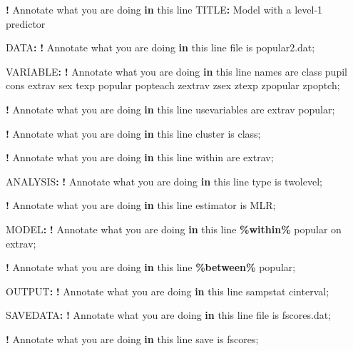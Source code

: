\documentclass[
]{book}
\newenvironment{Shaded}{\begin{snugshade}}{\end{snugshade}}
\newcommand{\ControlFlowTok}[1]{\textcolor[rgb]{0.13,0.29,0.53}{\textbf{#1}}}
\newcommand{\DecValTok}[1]{\textcolor[rgb]{0.00,0.00,0.81}{#1}}
\newcommand{\NormalTok}[1]{#1}
\newcommand{\SpecialCharTok}[1]{\textcolor[rgb]{0.81,0.36,0.00}{\textbf{#1}}}
\begin{document}
\begin{Shaded}
\begin{Highlighting}[]
\SpecialCharTok{!}\NormalTok{ Annotate what you are doing }\ControlFlowTok{in}\NormalTok{ this line}
\NormalTok{TITLE}\SpecialCharTok{:}\NormalTok{ Model with a level}\DecValTok{{-}1}\NormalTok{ predictor}

\NormalTok{DATA}\SpecialCharTok{:}
    \SpecialCharTok{!}\NormalTok{ Annotate what you are doing }\ControlFlowTok{in}\NormalTok{ this line}
\NormalTok{    file is popular2.dat;}

\NormalTok{VARIABLE}\SpecialCharTok{:}
    \SpecialCharTok{!}\NormalTok{ Annotate what you are doing }\ControlFlowTok{in}\NormalTok{ this line}
\NormalTok{    names are class pupil cons extrav sex texp popular popteach zextrav}
\NormalTok{    zsex ztexp zpopular zpoptch;}
    
    \SpecialCharTok{!}\NormalTok{ Annotate what you are doing }\ControlFlowTok{in}\NormalTok{ this line}
\NormalTok{    usevariables are extrav popular;}
    
    \SpecialCharTok{!}\NormalTok{ Annotate what you are doing }\ControlFlowTok{in}\NormalTok{ this line}
\NormalTok{    cluster is class;}
    
    \SpecialCharTok{!}\NormalTok{ Annotate what you are doing }\ControlFlowTok{in}\NormalTok{ this line}
\NormalTok{    within are extrav;}

\NormalTok{ANALYSIS}\SpecialCharTok{:}
    \SpecialCharTok{!}\NormalTok{ Annotate what you are doing }\ControlFlowTok{in}\NormalTok{ this line}
\NormalTok{    type is twolevel;}
    
    \SpecialCharTok{!}\NormalTok{ Annotate what you are doing }\ControlFlowTok{in}\NormalTok{ this line}
\NormalTok{    estimator is MLR;}

\NormalTok{MODEL}\SpecialCharTok{:}
    \SpecialCharTok{!}\NormalTok{ Annotate what you are doing }\ControlFlowTok{in}\NormalTok{ this line}
    \SpecialCharTok{\%within\%}
\NormalTok{    popular on extrav;}

    \SpecialCharTok{!}\NormalTok{ Annotate what you are doing }\ControlFlowTok{in}\NormalTok{ this line}
    \SpecialCharTok{\%between\%}
\NormalTok{    popular;}

\NormalTok{OUTPUT}\SpecialCharTok{:}
    \SpecialCharTok{!}\NormalTok{ Annotate what you are doing }\ControlFlowTok{in}\NormalTok{ this line}
\NormalTok{    sampstat cinterval;}

\NormalTok{SAVEDATA}\SpecialCharTok{:}
    \SpecialCharTok{!}\NormalTok{ Annotate what you are doing }\ControlFlowTok{in}\NormalTok{ this line}
\NormalTok{    file is fscores.dat;}
    
    \SpecialCharTok{!}\NormalTok{ Annotate what you are doing }\ControlFlowTok{in}\NormalTok{ this line}
\NormalTok{    save is fscores;}
\end{Highlighting}
\end{Shaded}
\end{document}
